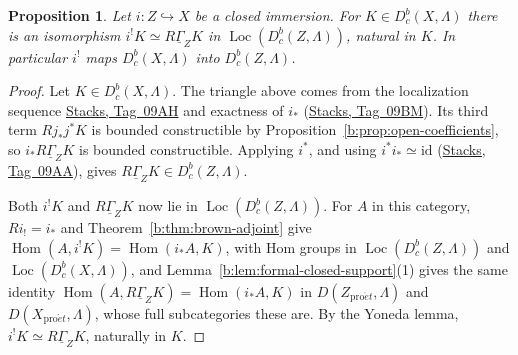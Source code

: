 \documentclass[11pt,a4paper]{article}
\numberwithin{equation}{section}
\newtheorem{proposition}[theorem]{Proposition}
\theoremstyle{definition}
\theoremstyle{remark}
\newcommand{\Dbc}{D^b_c}
\newcommand{\Loc}{\operatorname{Loc}}
\newcommand{\proet}{\mathrm{pro}\acute{e}t}
\newcommand{\stacks}[1]{\href{https://stacks.math.columbia.edu/tag/#1}{\textnormal{Stacks, Tag~#1}}}
\newcommand{\Hom}{\operatorname{Hom}}
\begin{document}
\begin{proposition}\label{b:prop:closed-adjoint-constructible}
Let $i:Z\hookrightarrow X$ be a closed immersion. For
$K\in\Dbc(X,\Lambda)$ there is an isomorphism
$i^!K\simeq R\underline\Gamma_ZK$ in $\Loc(\Dbc(Z,\Lambda))$, natural in $K$. In particular $i^!$
maps $\Dbc(X,\Lambda)$ into $\Dbc(Z,\Lambda)$.
\end{proposition}
\begin{proof}
Let $K\in\Dbc(X,\Lambda)$. The triangle above comes from the localization
sequence \stacks{09AH} and exactness of $i_*$ (\stacks{09BM}). Its third
term $Rj_*j^*K$ is bounded constructible by
Proposition~\ref{b:prop:open-coefficients}, so $i_*R\underline\Gamma_ZK$ is
bounded constructible. Applying $i^*$, and using $i^*i_*\simeq\mathrm{id}$
(\stacks{09AA}), gives $R\underline\Gamma_ZK\in\Dbc(Z,\Lambda)$.

Both $i^!K$ and $R\underline\Gamma_ZK$ now lie in $\Loc(\Dbc(Z,\Lambda))$.
For $A$ in this category, $Ri_!=i_*$ and
Theorem~\ref{b:thm:brown-adjoint} give $\Hom(A,i^!K)=\Hom(i_*A,K)$, with
Hom groups in $\Loc(\Dbc(Z,\Lambda))$ and $\Loc(\Dbc(X,\Lambda))$, and
Lemma~\ref{b:lem:formal-closed-support}(1) gives the same identity
$\Hom(A,R\underline\Gamma_ZK)=\Hom(i_*A,K)$ in $D(Z_{\proet},\Lambda)$ and
$D(X_{\proet},\Lambda)$, whose full subcategories these are. By the Yoneda lemma,
$i^!K\simeq R\underline\Gamma_ZK$, naturally in $K$.
\end{proof}
\end{document}
